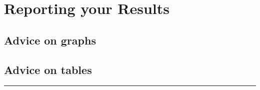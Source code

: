 \documentclass[
]{report}
\begin{document}
\hypertarget{reporting-your-results}{%
\chapter{Reporting your Results}\label{reporting-your-results}}

\hypertarget{advice-on-graphs}{%
\section{Advice on graphs}\label{advice-on-graphs}}

\hypertarget{advice-on-tables}{%
\section{Advice on tables}\label{advice-on-tables}}

\begin{center}\rule{0.5\linewidth}{0.5pt}\end{center}

  
\end{document}
